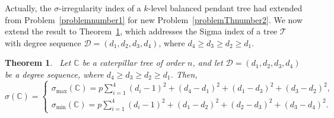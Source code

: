 \documentclass[12pt, a4paper]{article}
\theoremstyle{plain}  %
\newtheorem{theorem}{Theorem}[section]
\theoremstyle{definition}  %
\newcommand{\TT}{\mathcal{T}}
\newcommand{\CC}{\mathbb{C}}
\begin{document}
Actually, the $\sigma$-irregularity index of a $k$-level balanced pendant tree had extended from Problem~\ref{problemnumber1} for new Problem~\ref{problemThnumber2}. 
We now extend the result to Theorem~\ref{le.sigma2}, 
which addresses the Sigma index of a tree $\TT$ with degree sequence $\mathscr{D}=(d_1, d_2, d_3, d_4)$, where $d_4 \geqslant d_3 \geqslant d_2 \geqslant d_1$.


\begin{theorem}~\label{le.sigma2}
Let $\CC$ be a caterpillar tree of order $n$, and let $\mathscr{D} = (d_1, d_2, d_3, d_4)$ be a degree sequence, where $d_4 \geqslant d_3 \geqslant d_2 \geqslant d_1$. Then, 
\[
\sigma(\CC)=\begin{cases}
\sigma_{\max}(\CC)=p \sum_{i=1}^{4} (d_i-1)^2+(d_4-d_1)^2+(d_1-d_3)^2+(d_3-d_2)^2, \\
 \sigma_{\min}(\CC)= p \sum_{i=1}^{4} (d_i-1)^2+(d_1-d_2)^2+(d_2-d_3)^2+(d_3-d_4)^2.
\end{cases}
\]
\end{theorem}
\end{document}
